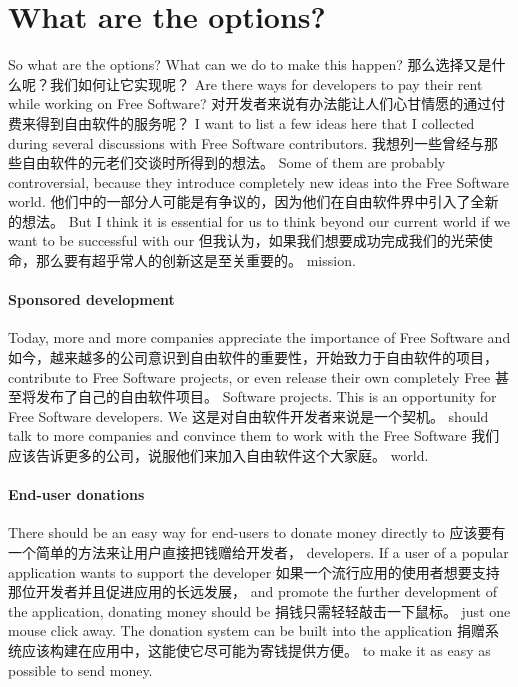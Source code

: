 \section*{What are the options?}

So what are the options? What can we do to make this happen?
那么选择又是什么呢？我们如何让它实现呢？
Are there ways for developers to pay their rent while working on Free Software? 
对开发者来说有办法能让人们心甘情愿的通过付费来得到自由软件的服务呢？
I want to list a few ideas here that I collected during several discussions with Free Software contributors.
我想列一些曾经与那些自由软件的元老们交谈时所得到的想法。
Some of them are probably controversial, because they introduce completely new ideas into the Free Software world.
他们中的一部分人可能是有争议的，因为他们在自由软件界中引入了全新的想法。
But I think it is essential for us to think beyond our current world if we want to be successful with our
但我认为，如果我们想要成功完成我们的光荣使命，那么要有超乎常人的创新这是至关重要的。
mission.  

\paragraph*{Sponsored development}

Today, more and more companies appreciate the importance of Free Software and
如今，越来越多的公司意识到自由软件的重要性，开始致力于自由软件的项目，
contribute to Free Software projects, or even release their own completely Free
甚至将发布了自己的自由软件项目。
Software projects. This is an opportunity for Free Software developers. We
这是对自由软件开发者来说是一个契机。
should talk to more companies and convince them to work with the Free Software
我们应该告诉更多的公司，说服他们来加入自由软件这个大家庭。
world. 

\paragraph*{End-user donations}

There should be an easy way for end-users to donate money directly to
应该要有一个简单的方法来让用户直接把钱赠给开发者，
developers. If a user of a popular application wants to support the developer
如果一个流行应用的使用者想要支持那位开发者并且促进应用的长远发展，
and promote the further development of the application, donating money should be
捐钱只需轻轻敲击一下鼠标。
just one mouse click away. The donation system can be built into the application
捐赠系统应该构建在应用中，这能使它尽可能为寄钱提供方便。
to make it as easy as possible to send money.

